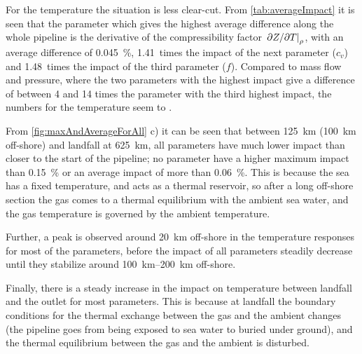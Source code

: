 % 

For the temperature the situation is less clear-cut. From \cref{tab:averageImpact} it is seen that the parameter which gives the highest average difference along the whole pipeline is the derivative of the compressibility factor $\eval{\partial Z/\partial T}_\rho$, with an average difference of \SI{0.045}{\percent}, 1.41~times the impact of the next parameter ($c_v$) and 1.48~times the impact of the third parameter ($f$). Compared to mass flow and pressure, where the two parameters with the highest impact give a difference of between 4 and 14 times the parameter with the third highest impact, the numbers for the temperature seem to .

From \cref{fig:maxAndAverageForAll} c) it can be seen that between \SI{125}{\kilo\meter} (\SI{100}{\kilo\meter} off-shore) and landfall at \SI{625}{\kilo\meter}, all parameters have much lower impact than closer to the start of the pipeline; no parameter have a higher maximum impact than \SI{0.15}{\percent} or an average impact of more than \SI{0.06}{\percent}. %
This is because the sea has a fixed temperature, and acts as a thermal reservoir, so after a long off-shore section the gas comes to a thermal equilibrium with the ambient sea water, and the gas temperature is governed by the ambient temperature.

Further, a peak is observed around \SI{20}{\kilo\meter} off-shore in the temperature responses for most of the parameters, before the impact of all parameters steadily decrease until they stabilize around \SIrange{100}{200}{\kilo\meter} off-shore. 

Finally, there is a steady increase in the impact on temperature between landfall and the outlet for most parameters. This is because at landfall the boundary conditions for the thermal exchange between the gas and the ambient changes (the pipeline goes from being exposed to sea water to buried under ground), and the thermal equilibrium between the gas and the ambient is disturbed. %

